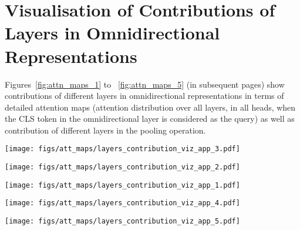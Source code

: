 \documentclass{article}
\begin{document}
\section{Visualisation of Contributions of Layers in Omnidirectional Representations}
\label{app:vis}
Figures~\ref{fig:attn_maps_1} to ~\ref{fig:attn_maps_5} (in subsequent pages) show contributions of different layers in omnidirectional representations in terms of detailed attention maps (attention distribution over all layers, in all heads, when the CLS token in the omnidirectional layer is considered as the query) as well as contribution of different layers in the pooling operation.


\begin{figure*}
\vspace{-10pt}
\centering
\texttt{[image: figs/att\_maps/layers\_contribution\_viz\_app\_3.pdf]}
\vspace{-10pt}
\caption{Contributions of different layers in omnidirectional representations for Example \#1.}
\label{fig:attn_maps_1}
\end{figure*}
\begin{figure*}
\centering
\texttt{[image: figs/att\_maps/layers\_contribution\_viz\_app\_2.pdf]}
\vspace{-10pt}
\caption{Contributions of different layers in omnidirectional representations for Example \#2.}
\label{fig:attn_maps_2}
\end{figure*}

\begin{figure*}
\vspace{-10pt}
\centering
\texttt{[image: figs/att\_maps/layers\_contribution\_viz\_app\_1.pdf]}
\vspace{-10pt}
\caption{Contributions of different layers in omnidirectional representations for Example \#3.}
\label{fig:attn_maps_3}
\end{figure*}

\begin{figure*}
\centering
\texttt{[image: figs/att\_maps/layers\_contribution\_viz\_app\_4.pdf]}
\vspace{-10pt}
\caption{Contributions of different layers in omnidirectional representations for Example \#4.}
\label{fig:attn_maps_4}
\end{figure*}

\begin{figure*}
\vspace{-10pt}
\centering
\texttt{[image: figs/att\_maps/layers\_contribution\_viz\_app\_5.pdf]}
\vspace{-10pt}
\caption{Contributions of different layers in omnidirectional representations for Example \#5.}
\label{fig:attn_maps_5}
\end{figure*}
\end{document}
